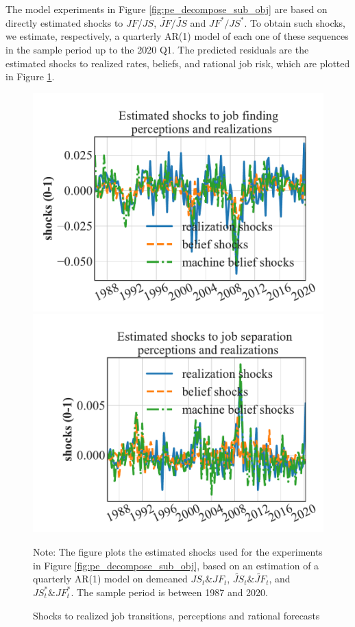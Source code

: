 The model experiments in Figure \ref{fig:pe_decompose_sub_obj} are based on directly estimated shocks to $JF$/$JS$, $\widetilde{JF}/\widetilde{JS}$ and ${JF}^*/{JS}^*$. To obtain such shocks, we estimate, respectively, a quarterly AR(1) model of each one of these sequences in the sample period up to the 2020 Q1. The predicted residuals are the estimated shocks to realized rates, beliefs, and rational job risk, which are plotted in Figure \ref{fig:shocks_from_data}. 

\begin{figure}[pt]
    \centering
    \caption{Shocks to realized job transitions, perceptions and rational forecasts}
    \label{fig:shocks_from_data} \includegraphics[width=0.45\linewidth]{text/Chapter2/Figures/estimated_shocks_job_finding.pdf}
    \includegraphics[width=0.45\linewidth]{text/Chapter2/Figures/estimated_shocks_job_separation.pdf}
\begin{flushleft}\footnotesize {Note: The figure plots the estimated shocks used for the experiments in Figure \ref{fig:pe_decompose_sub_obj}, based on an estimation of a quarterly AR(1) model on demeaned $JS_{t}\& JF_t$, $\widetilde{JS}_t \& \widetilde{JF}_t$, and $JS^{*}_t \& JF^{*}_t$. The sample period is between 1987 and 2020.} \end{flushleft}
\end{figure}



